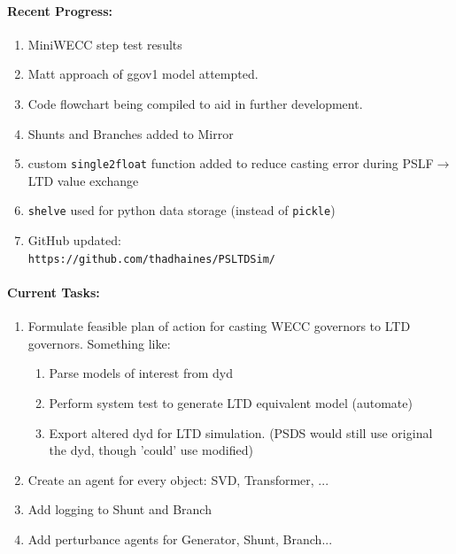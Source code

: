 \documentclass[12pt]{article}
\begin{document}
\begin{multicols}{2}

	\paragraph{Recent Progress:}
	\begin{enumerate}
		\item MiniWECC step test results
		
		\item Matt approach of ggov1 model attempted.

		\item Code flowchart being compiled to aid in further development.

		\item Shunts and Branches added to Mirror
		\item custom \verb|single2float| function added to reduce casting error during PSLF$\longrightarrow$LTD value exchange

		\item \verb|shelve| used for python data storage (instead of \verb|pickle|)

		\item GitHub updated:\\
		\verb|https://github.com/thadhaines/PSLTDSim/|
		
	\end{enumerate}
\paragraph{Current Tasks:}
	\begin{enumerate}
		\item Formulate feasible plan of action for casting WECC governors to LTD governors. Something like:
		\begin{enumerate}
		\item Parse models of interest from dyd
		\item Perform system test to generate LTD equivalent model (automate)
		\item Export altered dyd for LTD simulation. (PSDS would still use original the dyd, though 'could' use modified)
		\end{enumerate}
		
		\item Create an agent for every object: SVD, Transformer, ...
		\item Add logging to Shunt and Branch
		\item Add perturbance agents for Generator, Shunt, Branch...


\end{enumerate}
\end{multicols}
\end{document}
